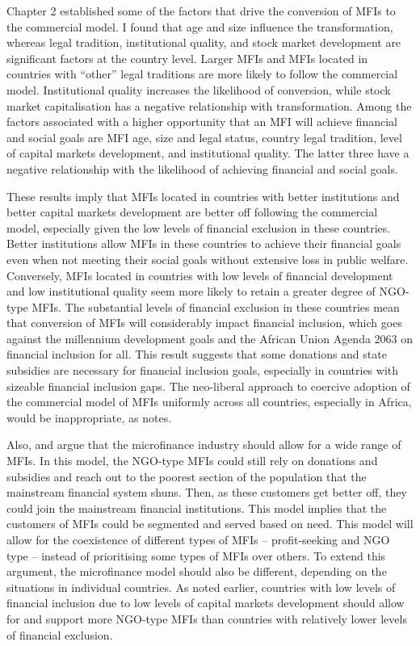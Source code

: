 \documentclass[a4paper, nobind]{templates/ociamthesis}
\begin{document}
Chapter 2 established some of the factors that drive the conversion of MFIs to the commercial model. I found that age and size influence the transformation, whereas legal tradition, institutional quality, and stock market development are significant factors at the country level. Larger MFIs and MFIs located in countries with ``other'' legal traditions are more likely to follow the commercial model. Institutional quality increases the likelihood of conversion, while stock market capitalisation has a negative relationship with transformation. Among the factors associated with a higher opportunity that an MFI will achieve financial and social goals are MFI age, size and legal status, country legal tradition, level of capital markets development, and institutional quality. The latter three have a negative relationship with the likelihood of achieving financial and social goals.

These results imply that MFIs located in countries with better institutions and better capital markets development are better off following the commercial model, especially given the low levels of financial exclusion in these countries. Better institutions allow MFIs in these countries to achieve their financial goals even when not meeting their social goals without extensive loss in public welfare. Conversely, MFIs located in countries with low levels of financial development and low institutional quality seem more likely to retain a greater degree of NGO-type MFIs. The substantial levels of financial exclusion in these countries mean that conversion of MFIs will considerably impact financial inclusion, which goes against the millennium development goals and the African Union Agenda 2063 on financial inclusion for all. This result suggests that some donations and state subsidies are necessary for financial inclusion goals, especially in countries with sizeable financial inclusion gaps. The neo-liberal approach to coercive adoption of the commercial model of MFIs uniformly across all countries, especially in Africa, would be inappropriate, as \textcite{bateman2010doesn} notes.

Also, \textcite{morduch1999microfinance} and \textcite{morduch2000microfinance} argue that the microfinance industry should allow for a wide range of MFIs. In this model, the NGO-type MFIs could still rely on donations and subsidies and reach out to the poorest section of the population that the mainstream financial system shuns. Then, as these customers get better off, they could join the mainstream financial institutions. This model implies that the customers of MFIs could be segmented and served based on need. This model will allow for the coexistence of different types of MFIs -- profit-seeking and NGO type -- instead of prioritising some types of MFIs over others. To extend this argument, the microfinance model should also be different, depending on the situations in individual countries. As noted earlier, countries with low levels of financial inclusion due to low levels of capital markets development should allow for and support more NGO-type MFIs than countries with relatively lower levels of financial exclusion.
\end{document}
